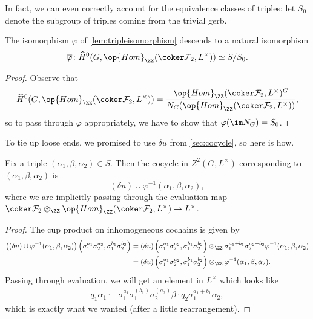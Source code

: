 \documentclass{article}
\begin{document}
In fact, we can even correctly account for the equivalence classes of triples; let $S_0$ denote the subgroup of triples coming from the trivial gerb.
\begin{proposition}
	The isomorphism $\varphi$ of \autoref{lem:tripleisomorphism} descends to a natural isomorphism
	\[\overline\varphi\colon\widehat H^0(G,\op{Hom}_\ZZ(\coker\mathcal F_2,L^\times))\simeq S/S_0.\]
\end{proposition}
\begin{proof}
	Observe that
	\[\widehat H^0(G,\op{Hom}_\ZZ(\coker\mathcal F_2,L^\times))=\frac{\op{Hom}_\ZZ(\coker\mathcal F_2,L^\times)^G}{N_G(\op{Hom}_\ZZ(\coker\mathcal F_2,L^\times))},\]
	so to pass through $\varphi$ appropriately, we have to show that $\varphi(\im N_G)=S_0$.
\end{proof}
To tie up loose ends, we promised to use $\delta u$ from \autoref{sec:cocycle}, so here is how.
\begin{proposition}
	Fix a triple $(\alpha_1,\beta,\alpha_2)\in S$. Then the cocycle in $Z^2(G,L^\times)$ corresponding to $(\alpha_1,\beta,\alpha_2)$ is
	\[(\delta u)\cup\varphi^{-1}(\alpha_1,\beta,\alpha_2),\]
	where we are implicitly passing through the evaluation map $\coker\mathcal F_2\otimes_{\ZZ}\op{Hom}_\ZZ(\coker\mathcal F_2,L^\times)\to L^\times$.
\end{proposition}
\begin{proof}
	The cup product on inhomogeneous cochains is given by
	\begin{align*}
		\big((\delta u)\cup\varphi^{-1}(\alpha_1,\beta,\alpha_2)\big)\left(\sigma_1^{a_1}\sigma_2^{a_2},\sigma_1^{b_1}\sigma_2^{b_2}\right) &= (\delta u)\left(\sigma_1^{a_1}\sigma_2^{a_2},\sigma_1^{b_1}\sigma_2^{b_2}\right)\otimes_\ZZ\sigma_1^{a_1+b_1}\sigma_2^{a_2+b_2}\varphi^{-1}(\alpha_1,\beta,\alpha_2) \\
		&= (\delta u)\left(\sigma_1^{a_1}\sigma_2^{a_2},\sigma_1^{b_1}\sigma_2^{b_2}\right)\otimes_\ZZ\varphi^{-1}(\alpha_1,\beta,\alpha_2).
	\end{align*}
	Passing through evaluation, we will get an element in $L^\times$ which looks like
	\begin{align*}
		q_1\alpha_1\cdot-\sigma_1^{a_1}\sigma_1^{(b_1)}\sigma_2^{(a_2)}\beta\cdot q_2\sigma_1^{a_1+b_1}\alpha_2,
	\end{align*}
	which is exactly what we wanted (after a little rearrangement).
\end{proof}
\end{document}
